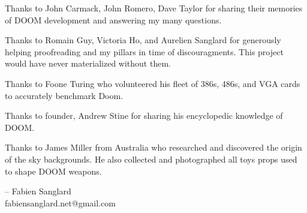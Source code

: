 Thanks to John Carmack, John Romero, Dave Taylor for sharing their memories of DOOM development and answering my many questions.\\
\par
Thanks to Romain Guy, Victoria Ho, and Aurelien Sanglard for generously helping proofreading and my pillars in time of discouragments. This project would have never materialized without them.\\ 
\par
Thanks to Foone Turing who volunteered his fleet of 386s, 486s, and VGA cards to accurately benchmark Doom.\\
\par
Thanks to  founder, Andrew Stine for sharing his encyclopedic knowledge of DOOM.\\
\par
Thanks to James Miller from Australia who researched and discovered the origin of the sky backgrounds. He also collected and photographed all toys props used to shape DOOM weapons.\\
\par

-- Fabien Sanglard\\
fabiensanglard.net@gmail.com
